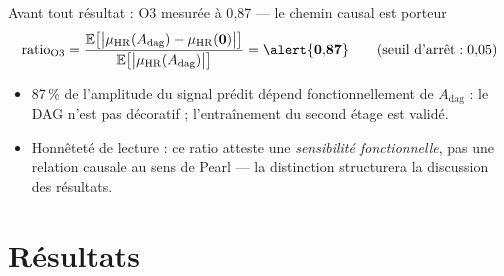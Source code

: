 \documentclass[aspectratio=169,10pt]{beamer}
\newcommand{\HR}{\mathrm{HR}}
\newcommand{\muHR}{\mu_{\HR}}
\newcommand{\Adag}{A_{\mathrm{dag}}}
\begin{document}
\begin{frame}{Avant tout résultat : O3 mesurée à 0{,}87 --- le chemin causal est porteur}
  \begin{equation*}
    \mathrm{ratio}_{\mathrm{O3}}
      = \frac{\mathbb{E}\big[ \big| \muHR(\Adag) - \muHR(\mathbf{0}) \big| \big]}
             {\mathbb{E}\big[ \big| \muHR(\Adag) \big| \big]}
      = \alert{\mathbf{0{,}87}}
    \qquad (\text{seuil d'arrêt} : 0{,}05)
  \end{equation*}
  \vspace{0.1cm}
  \begin{itemize}
    \item 87\,\% de l'amplitude du signal prédit dépend fonctionnellement de $\Adag$ :
          le DAG n'est \alert{pas décoratif} ; l'entraînement du second étage est validé.
    \item Honnêteté de lecture : ce ratio atteste une \emph{sensibilité fonctionnelle},
          pas une relation causale au sens de Pearl --- la distinction structurera
          la discussion des résultats.
  \end{itemize}
\end{frame}

\section{Résultats}
\end{document}
